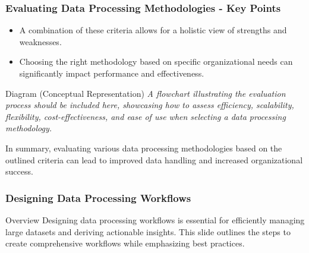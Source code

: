 \documentclass[aspectratio=169]{beamer}
\begin{document}
\begin{frame}[fragile]
    \frametitle{Evaluating Data Processing Methodologies - Key Points}
    \begin{itemize}
        \item A combination of these criteria allows for a holistic view of strengths and weaknesses.
        \item Choosing the right methodology based on specific organizational needs can significantly impact performance and effectiveness.
    \end{itemize}
    
    \begin{block}{Diagram (Conceptual Representation)}
        \textit{A flowchart illustrating the evaluation process should be included here, showcasing how to assess efficiency, scalability, flexibility, cost-effectiveness, and ease of use when selecting a data processing methodology.}
    \end{block}
    
    In summary, evaluating various data processing methodologies based on the outlined criteria can lead to improved data handling and increased organizational success.
\end{frame}

\begin{frame}[fragile]
    \frametitle{Designing Data Processing Workflows}
    \begin{block}{Overview}
        Designing data processing workflows is essential for efficiently managing large datasets and deriving actionable insights. This slide outlines the steps to create comprehensive workflows while emphasizing best practices.
    \end{block}
\end{frame}
\end{document}
